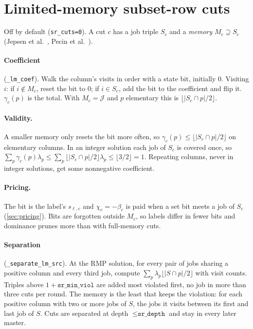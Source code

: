 \documentclass[11pt,a4paper]{article}
\theoremstyle{definition}
\theoremstyle{remark}
\newcommand{\J}{\mathcal{J}}
\newcommand{\code}[1]{\texttt{#1}}
\newcommand{\RMP}{\mathrm{RMP}}
\begin{document}
\section{Limited-memory subset-row cuts}\label{sec:cuts}

Off by default (\code{sr\_cuts=0}). A cut $c$ has a job triple $S_c$ and a
\emph{memory} $M_c\supseteq S_c$ (Jepsen et al.~\cite{jepsen2008}, Pecin et
al.~\cite{pecin2017}).

\paragraph{Coefficient} (\code{\_lm\_coef}). Walk the column's visits in order
with a state bit, initially $0$. Visiting $i$: if $i\notin M_c$, reset the bit
to $0$; if $i\in S_c$, add the bit to the coefficient and flip it.
$\gamma_c(p)$ is the total. With $M_c=\J$ and $p$ elementary this is
$\lfloor|S_c\cap p|/2\rfloor$.

\paragraph{Validity.} A smaller memory only resets the bit more often, so
$\gamma_c(p)\le\lfloor|S_c\cap p|/2\rfloor$ on elementary columns. In an
integer solution each job of $S_c$ is covered once, so
$\sum_p\gamma_c(p)\lambda_p\le\sum_p\lfloor|S_c\cap p|/2\rfloor\lambda_p\le\lfloor3/2\rfloor=1$.
Repeating columns, never in integer solutions, get some nonnegative coefficient.

\paragraph{Pricing.} The bit is the label's $s_{\ell,c}$ and $\chi_c=-\beta_c$
is paid when a set bit meets a job of $S_c$ (\cref{sec:pricing}). Bits are
forgotten outside $M_c$, so labels differ in fewer bits and dominance prunes
more than with full-memory cuts.

\paragraph{Separation} (\code{\_separate\_lm\_src}). At the $\RMP$ solution,
for every pair of jobs sharing a positive column and every third job, compute
$\sum_p\lambda_p\lfloor|S\cap p|/2\rfloor$ with visit counts. Triples above
$1+\texttt{sr\_min\_viol}$ are added most violated first, no job in more than
three cuts per round. The memory is the least that keeps the violation: for
each positive column with two or more jobs of $S$, the jobs it visits between
its first and last job of $S$. Cuts are separated at depth
$\le\texttt{sr\_depth}$ and stay in every later master.
\end{document}
